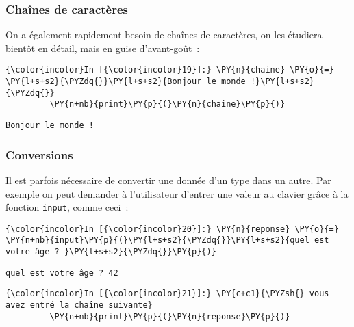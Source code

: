     \hypertarget{chauxeenes-de-caractuxe8res}{%
\subsubsection{Chaînes de
caractères}\label{chauxeenes-de-caractuxe8res}}

    On a également rapidement besoin de chaînes de caractères, on les
étudiera bientôt en détail, mais en guise d'avant-goût~:

    \begin{Verbatim}[commandchars=\\\{\}]
{\color{incolor}In [{\color{incolor}19}]:} \PY{n}{chaine} \PY{o}{=} \PY{l+s+s2}{\PYZdq{}}\PY{l+s+s2}{Bonjour le monde !}\PY{l+s+s2}{\PYZdq{}}
         \PY{n+nb}{print}\PY{p}{(}\PY{n}{chaine}\PY{p}{)}
\end{Verbatim}


    \begin{Verbatim}[commandchars=\\\{\}]
Bonjour le monde !

    \end{Verbatim}

    \hypertarget{conversions}{%
\subsubsection{Conversions}\label{conversions}}

    Il est parfois nécessaire de convertir une donnée d'un type dans un
autre. Par exemple on peut demander à l'utilisateur d'entrer une valeur
au clavier grâce à la fonction \texttt{input}, comme ceci~:

    \begin{Verbatim}[commandchars=\\\{\}]
{\color{incolor}In [{\color{incolor}20}]:} \PY{n}{reponse} \PY{o}{=} \PY{n+nb}{input}\PY{p}{(}\PY{l+s+s2}{\PYZdq{}}\PY{l+s+s2}{quel est votre âge ? }\PY{l+s+s2}{\PYZdq{}}\PY{p}{)}
\end{Verbatim}


    \begin{Verbatim}[commandchars=\\\{\}]
quel est votre âge ? 42

    \end{Verbatim}

    \begin{Verbatim}[commandchars=\\\{\}]
{\color{incolor}In [{\color{incolor}21}]:} \PY{c+c1}{\PYZsh{} vous avez entré la chaîne suivante}
         \PY{n+nb}{print}\PY{p}{(}\PY{n}{reponse}\PY{p}{)}
\end{Verbatim}


